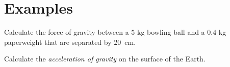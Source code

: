 \documentclass[10pt]{exam}
\begin{document}
\pagebreak

\section*{Examples}

\begin{questions}
  \question 
    Calculate the force of gravity between a 5-kg bowling ball and a 0.4-kg paperweight that are separated by 20~cm.
    \vs


  \question 
    Calculate the \emph{acceleration of gravity} on the surface of the Earth.
    \vs
\end{questions}
\end{document}
